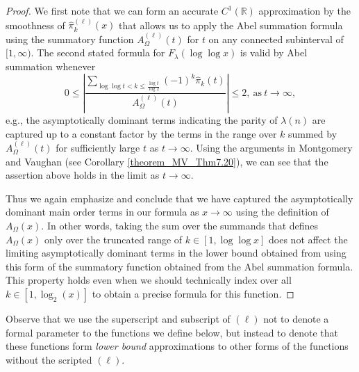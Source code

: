 \documentclass[11pt,reqno,a4letter]{article}
\numberwithin{figure}{section}
\numberwithin{table}{section}
\theoremstyle{plain}
\numberwithin{theorem}{section}
\theoremstyle{definition}
\begin{document}
\begin{proof} 
We first note that we can form an accurate $C^{1}(\mathbb{R})$ approximation by the smoothness of 
$\widehat{\pi}_k^{(\ell)}(x)$ that allows us to apply the Abel summation formula using the summatory 
function $A_{\Omega}^{(\ell)}(t)$ for $t$ on any connected subinterval of $[1, \infty)$. 
The second stated formula for $F_{\lambda}(\log\log x)$ is valid by Abel summation whenever 
\[
0 \leq \left\lvert \frac{\displaystyle\sum\limits_{\log\log t < k \leq \frac{\log t}{\log 2}} 
     (-1)^k \widehat{\pi}_k(t)}{A_{\Omega}^{(\ell)}(t)}\right\rvert \leq 2, 
     \mathrm{\ as\ } t \rightarrow \infty, 
\]
e.g., the asymptotically dominant terms indicating the parity of 
$\lambda(n)$ are captured up to a constant factor 
by the terms in the range over $k$ summed by 
$A_{\Omega}^{(\ell)}(t)$ for 
sufficiently large $t$ as $t \rightarrow \infty$. 
Using the arguments in Montgomery and Vaughan \cite[\S 7; Thm.\ 7.20]{MV} (see 
Corollary \ref{theorem_MV_Thm7.20}), we can see that 
the assertion above holds in the limit as $t \rightarrow \infty$. 

Thus we again emphasize and conclude that we have captured the 
asymptotically dominant main order terms in our formula as 
$x \rightarrow \infty$ using the definition of $A_{\Omega}(x)$. 
In other words, taking the sum over the summands that defines $A_{\Omega}(x)$ only over the truncated range of 
$k \in [1, \log\log x]$ does not affect the limiting asymptotically 
dominant terms in the lower bound obtained from using this form of the summatory function obtained from the 
Abel summation formula. This property holds even when we should technically 
index over all $k \in [1, \log_2(x)]$ to obtain a precise formula for this function. 
\end{proof} 

Observe that we use the superscript and subscript of $(\ell)$ not to denote a formal parameter to 
the functions we define below, but instead to denote that these functions form \emph{lower bound} 
approximations to other forms of the functions without the scripted $(\ell)$. 
\end{document}
